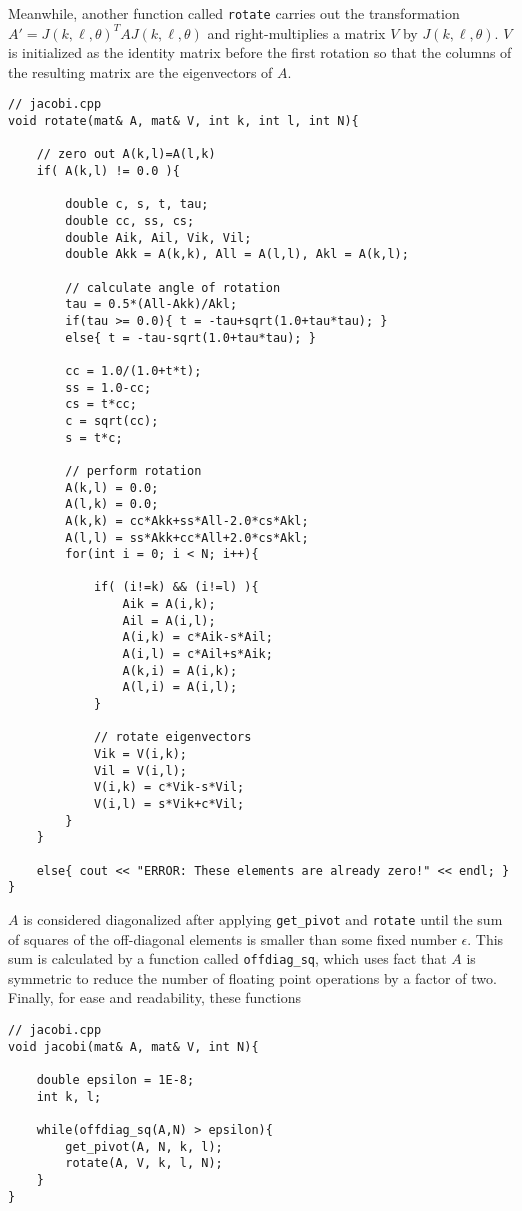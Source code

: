 \documentclass[prb,aps,twocolumn,showpacs,10pt]{revtex4-1}
\begin{document}
\noindent Meanwhile, another function called \texttt{rotate} carries out the transformation $A'=J(k,\ell,\theta)^TAJ(k,\ell,\theta)$ and right-multiplies a matrix $V$ by $J(k,\ell,\theta)$. $V$ is initialized as the identity matrix before the first rotation so that the columns of the resulting matrix are the eigenvectors of $A$. 

\begin{lstlisting}
// jacobi.cpp
void rotate(mat& A, mat& V, int k, int l, int N){

	// zero out A(k,l)=A(l,k)
	if( A(k,l) != 0.0 ){

		double c, s, t, tau;
		double cc, ss, cs;
		double Aik, Ail, Vik, Vil;
		double Akk = A(k,k), All = A(l,l), Akl = A(k,l);

		// calculate angle of rotation
		tau = 0.5*(All-Akk)/Akl;
		if(tau >= 0.0){ t = -tau+sqrt(1.0+tau*tau); }
		else{ t = -tau-sqrt(1.0+tau*tau); }

		cc = 1.0/(1.0+t*t);
		ss = 1.0-cc;
		cs = t*cc;
		c = sqrt(cc);
		s = t*c;

		// perform rotation
		A(k,l) = 0.0;
		A(l,k) = 0.0;
		A(k,k) = cc*Akk+ss*All-2.0*cs*Akl;
		A(l,l) = ss*Akk+cc*All+2.0*cs*Akl;
		for(int i = 0; i < N; i++){

			if( (i!=k) && (i!=l) ){
				Aik = A(i,k);
				Ail = A(i,l);
				A(i,k) = c*Aik-s*Ail;
				A(i,l) = c*Ail+s*Aik;
				A(k,i) = A(i,k);
				A(l,i) = A(i,l);
			}

			// rotate eigenvectors 
			Vik = V(i,k);
			Vil = V(i,l);
			V(i,k) = c*Vik-s*Vil;
			V(i,l) = s*Vik+c*Vil;
		}
	}

	else{ cout << "ERROR: These elements are already zero!" << endl; } 
}
\end{lstlisting}

\noindent $A$ is considered diagonalized after applying \texttt{get\_pivot} and \texttt{rotate} until the sum of squares of the off-diagonal elements is smaller than some fixed number $\epsilon$. This sum is calculated by a function called \texttt{offdiag\_sq}, which uses fact that $A$ is symmetric to reduce the number of floating point operations by a factor of two. Finally, for ease and readability, these functions 

\begin{lstlisting}
// jacobi.cpp 
void jacobi(mat& A, mat& V, int N){

	double epsilon = 1E-8;
	int k, l;

	while(offdiag_sq(A,N) > epsilon){
		get_pivot(A, N, k, l);
		rotate(A, V, k, l, N);
	}
}
\end{lstlisting}
\end{document}
